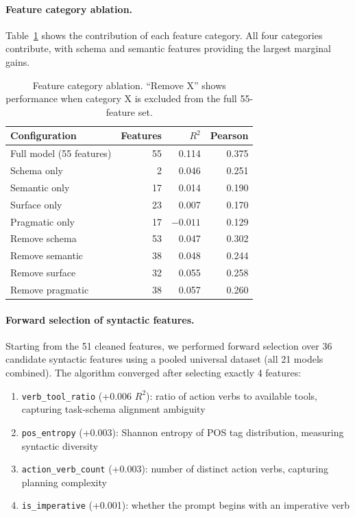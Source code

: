 \documentclass{article}
\begin{document}
\paragraph{Feature category ablation.}
Table~\ref{tab:ablation} shows the contribution of each feature category. All four categories contribute, with schema and semantic features providing the largest marginal gains.

\begin{table}[t]
\centering
\caption{Feature category ablation. ``Remove X'' shows performance when category X is excluded from the full 55-feature set.}
\label{tab:ablation}
\small
\begin{tabular}{@{}lrrr@{}}
\toprule
Configuration & Features & $R^2$ & Pearson \\
\midrule
Full model (55 features) & 55 & 0.114 & 0.375 \\
\midrule
Schema only & 2 & 0.046 & 0.251 \\
Semantic only & 17 & 0.014 & 0.190 \\
Surface only & 23 & 0.007 & 0.170 \\
Pragmatic only & 17 & $-0.011$ & 0.129 \\
\midrule
Remove schema & 53 & 0.047 & 0.302 \\
Remove semantic & 38 & 0.048 & 0.244 \\
Remove surface & 32 & 0.055 & 0.258 \\
Remove pragmatic & 38 & 0.057 & 0.260 \\
\bottomrule
\end{tabular}
\end{table}

\paragraph{Forward selection of syntactic features.}
Starting from the 51 cleaned features, we performed forward selection over 36 candidate syntactic features using a pooled universal dataset (all 21 models combined). The algorithm converged after selecting exactly 4 features:

\begin{enumerate}[itemsep=1pt, parsep=0pt]
\item \texttt{verb\_tool\_ratio} (+0.006 $R^2$): ratio of action verbs to available tools, capturing task-schema alignment ambiguity
\item \texttt{pos\_entropy} (+0.003): Shannon entropy of POS tag distribution, measuring syntactic diversity
\item \texttt{action\_verb\_count} (+0.003): number of distinct action verbs, capturing planning complexity
\item \texttt{is\_imperative} (+0.001): whether the prompt begins with an imperative verb
\end{enumerate}
\end{document}
